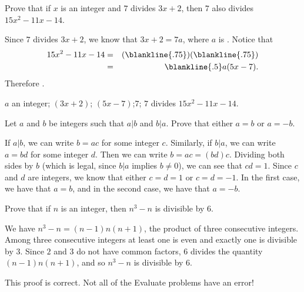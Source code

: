 \vspace*{-.1in}

\begin{fib} Prove that if $x$ is an integer and
$7$ divides $3x + 2$, then $7$ also divides $15x^2 - 11x - 14$.\\[-.35in]
\begin{pf}
Since $7$ divides $3x+2$, we know that  $3x + 2 = 7a$, where $a$ is .
Notice that 
\begin{eqnarray*}
15x^2 - 11x - 14&=& (\blankline{.75})(\blankline{.75})\\
&=&\blankline{.5}a(5x-7).
\end{eqnarray*}
Therefore .
\end{pf}
\begin{answer}
$a$ an integer; $(3x + 2)$; $(5x - 7)$;$7$; $7$ divides $15x^2 - 11x - 14$.
\end{answer}
\end{fib}

\vspace*{-.1in}

\begin{exa}
Let $a$ and $b$ be integers such that $a|b$ and $b|a$.
Prove that either $a=b$ or $a=-b$.
\begin{pf}
If $a|b$, we can write $b=ac$ for some integer $c$.
Similarly, if $b|a$, we can write $a=bd$ for some integer $d$.
Then we can write $b=ac=(bd)c$.  Dividing both sides by $b$
(which is legal, since $b|a$ implies $b\neq 0$), we
can see that $cd=1$. Since $c$ and $d$ are integers, we know
that either $c=d=1$ or $c=d=-1$.  In the first case, we
have that $a=b$, and in the second case, we have that $a=-b$.
\end{pf}
\end{exa}

\vspace*{-.1in}

\begin{eval}
Prove that if $n$ is an integer, then $n^3 - n$ is divisible by $6$.
\begin{spf}
We have $n^3 - n = (n-1)n(n + 1)$, the product of three consecutive integers.
Among three consecutive integers at least one is even
and exactly one is divisible by $3$. Since $2$ and
$3$ do not have common factors, $6$ divides the quantity
$(n-1)n(n+1)$, and so $n^3 - n$ is divisible by $6$.
\end{spf}
\evalline
\begin{answer}
This proof is correct.  Not all of the Evaluate problems have an error!
\end{answer}
\end{eval}


